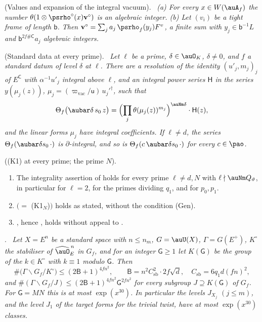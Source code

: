 \documentclass[10pt]{amsart}
\theoremstyle{definition}
\theoremstyle{remark}
\providecommand{\psvac}{\mathbf v}
\newenvironment{quotedthm}[2]{\par\medskip\noindent\begingroup
  \textbf{#1}#2.\ \itshape\ignorespaces}{\endgroup\par\medskip}
\begin{document}
\begin{quotedthm}{\cite[Lemma~7.14]{P49}}{ (Values and expansion of the integral vacuum)}
{\rm(a)} For every $x\in W(\auA_f)$ the number $\theta(1\otimes\psrho^\circ(x)\psvac^\circ)$ is an
algebraic integer.
{\rm(b)} Let $(v_i)$ be a tight frame of length $\mathsf b$. Then $\psvac^\circ=\sum_ja_j\,
\psrho_f(y_j)F^v$, a finite sum with $y_j\in\mathsf b^{-1}L$ and $\mathsf b^{2f\#\mathsf C}a_j$
algebraic integers.
\end{quotedthm}

\begin{quotedthm}{\cite[Theorem~7.15]{P49}}{ (Standard data at every prime)}
Let $\ell$ be a prime, $\delta\in\auO_K$, $\delta\ne0$, and $f$ a standard datum of level $\delta$
at $\ell$. There are a resolution of the identity $(u'_j,m_j)_j$ of $E^{\mathsf C}$ with
$\alpha^{-1}u'_j$ integral above $\ell$, and an integral power series $\mathsf H$ in the series
$y(\mu_j(z))$, $\mu_j=(\varpi_{\mathrm{vac}}/\mathsf u)\,u_j'^{\dagger}$, such that
\[
\Theta_f\bigl(\aubar\delta\,s_0\,z\bigr)=\Bigl(\prod_j\theta(\mu_j(z))^{m_j}\Bigr)^{\auNm\delta}
\cdot\mathsf H(z),
\]
and the linear forms $\mu_j$ have integral coefficients. If $\ell\ne d$, the series
$\Theta_f(\aubar\delta s_0\,\cdot)$ is $\partial$-integral, and so is $\Theta_f(c\,\aubar\delta s_0
\,\cdot)$ for every $c\in\pao$.
\end{quotedthm}

\begin{quotedthm}{\cite[Corollary~7.16]{P49}}{ ({\rm(K1)} at every prime; the prime $N$)}
\begin{enumerate}
\item[(a)] The integrality assertion of {\cite[Lemma~4.13{\rm(K1)}]{P49}} holds for every prime
$\ell\ne d,N$ with $\ell\nmid\auNm Q_\vartheta$, in particular for $\ell=2$, for the primes
dividing $q_1$, and for $p_0,p_1$.
\item[(b)] {\cite[Lemma~6.20]{P49}} $(=$ {\rm(K1$_N$)}$)$ holds as stated, without the condition
{\rm(Gen)}.
\item[(c)] {\cite[Proposition~5.29{\rm(S3)}]{P49}}, hence {\cite[Lemma~4.13{\rm(K2)}]{P49}}, holds without
appeal to \cite{KubertLang}.
\end{enumerate}
\end{quotedthm}

\begin{quotedthm}{\cite[Proposition~7.20]{P49}}{}
Let $X=E^n$ be a standard space with $n\le n_m$, $G=\auU(X)$, $\Gamma=G(E^+)$, $K^\circ$ the
stabiliser of $\widehat\auO_E^{\,n}$ in $G_f$, and for an integer $\mathsf G\ge1$ let $K(\mathsf G)$
be the group of the $k\in K^\circ$ with $k\equiv1$ modulo $\mathsf G$. Then
\[
\#\bigl(\Gamma\backslash G_f/K^\circ\bigr)\le(2\mathsf B+1)^{4fn^2},\qquad\mathsf B=n^2C_{\mathrm{sb}}^2
\cdot2f\sqrt d,\quad C_{\mathrm{sb}}=6q_1d(fn)^2,
\]
and $\#(\Gamma\backslash G_f/J)\le(2\mathsf B+1)^{4fn^2}\mathsf G^{2fn^2}$ for every subgroup
$J\supseteq K(\mathsf G)$ of $G_f$. For $\mathsf G=MN$ this is at most $\exp(x^{30})$. In
particular the levels $J_{X_j}$ $(j\le m)$, and the level $J_1$ of the target forms for the trivial
twist, have at most $\exp(x^{30})$ classes.
\end{quotedthm}
\end{document}
